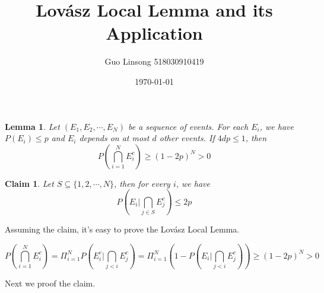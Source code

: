 \documentclass{article}
\title{Lovász Local Lemma and its Application}
\author{Guo Linsong 518030910419}
\date{\today}
\newtheorem{lemma}[theorem]{Lemma}
\newtheorem{claim}[theorem]{Claim}
\begin{document}
\maketitle


\begin{tcolorbox}
    \begin{lemma}
        Let $(E_1,E_2,\cdots,E_N)$ be a sequence of events. For each $E_i$, we have $P(E_i)\leq p$ and $E_i$ depends on at most $d$ other events. If $4dp\leq 1$, then
        $$P\left(\bigcap_{i=1}^N E_i^c\right)\geq (1-2p)^N>0$$
   \end{lemma}
\end{tcolorbox}

\begin{tcolorbox}
\begin{claim}
    Let $S\subseteq \{1,2,\cdots,N\}$, then for every $i$, we have
    $$P\left(E_i\Bigg| \bigcap_{j\in S}E_j^c\right)\leq 2p$$
\end{claim}
\end{tcolorbox}

Assuming the claim, it's easy to prove the Lovász Local Lemma.

$$P\left(\bigcap_{i=1}^N E_i^c\right)=\Pi_{i=1}^NP\left(E_i^c\Big| \bigcap_{j<i} E_j^c\right)=\Pi_{i=1}^N\left(1-P\left(E_i \Big| \bigcap_{j<i} E_j^c\right)\right)
\geq \left(1-2p\right)^N>0$$

Next we proof the claim.
\end{document}
